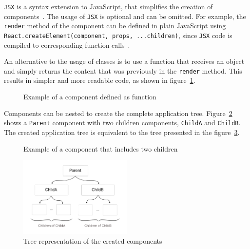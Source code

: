 \texttt{JSX} is a syntax extension to JavaScript, that simplifies the
creation of components~\cite{react_jsx}. The usage of \texttt{JSX} is optional and can be
omitted. For example, the \texttt{render} method of the component can be defined
in plain JavaScript using \texttt{React.createElement(component,\ props,\ ...children)},
since \texttt{JSX} code is compiled to corresponding function calls~\cite{react_jsx}.

An alternative to the usage of classes is to use a function that
receives an object and simply returns the content that was previously in
the \texttt{render} method. This results in simpler and more readable
code, as shown in figure~\ref{code_hello_message_function}.

\begin{figure}[]
\begin{Shaded}
\begin{Highlighting}[]
 
    \VariableTok{\{}\VariableTok{\}}\OperatorTok{;}
\NormalTok{\}}
\end{Highlighting}
\end{Shaded}
\caption{Example of a component defined as function}
\label{code_hello_message_function}
\end{figure}

Components can be nested to create the complete application tree.
Figure~\ref{code_parent_with_children} shows a \texttt{Parent} component
with two children components,
\texttt{ChildA} and \texttt{ChildB}. The created application tree is
equivalent to the tree presented in the figure~\ref{image_react_tree}.

\begin{figure}[h!]
\begin{Shaded}
\begin{Highlighting}[]
 \NormalTok{ () \{}
   \OperatorTok{;}
\NormalTok{\}}
\end{Highlighting}
\end{Shaded}
\caption{Example of a component that includes two children}
\label{code_parent_with_children}
\end{figure}

\begin{figure}[h!]
    \centering
    \includegraphics[width=0.5\textwidth]{images/react_parent_child}
    \caption{Tree representation of the created components}
    \label{image_react_tree}
\end{figure}

